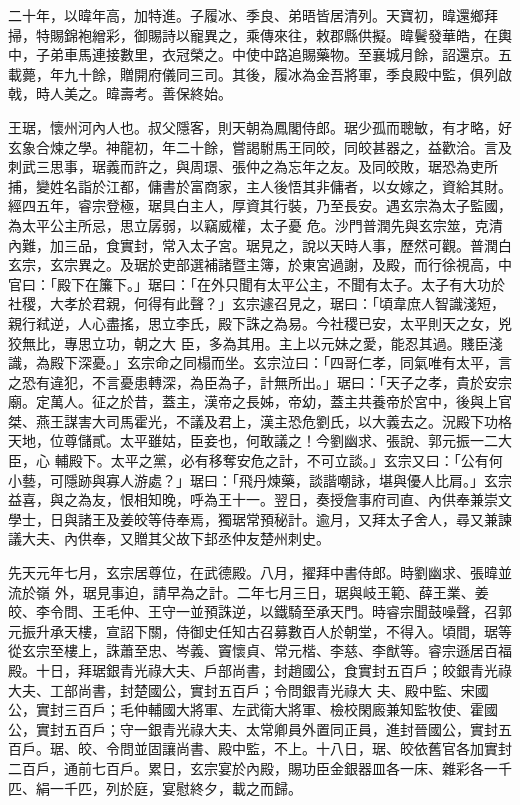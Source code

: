 \begin{pinyinscope}
 二十年，以暐年高，加特進。子履冰、季良、弟晤皆居清列。天寶初，暐還鄉拜掃，特賜錦袍繒彩，御賜詩以寵異之，乘傳來往，敕郡縣供擬。暐鬢發華皓，在輿中，子弟車馬連接數里，衣冠榮之。中使中路追賜藥物。至襄城月餘，詔還京。五載薨，年九十餘，贈開府儀同三司。其後，履冰為金吾將軍，季良殿中監，俱列啟戟，時人美之。暐壽考。善保終始。



 王琚，懷州河內人也。叔父隱客，則天朝為鳳閣侍郎。琚少孤而聰敏，有才略，好玄象合煉之學。神龍初，年二十餘，嘗謁駙馬王同皎，同皎甚器之，益歡洽。言及刺武三思事，琚義而許之，與周璟、張仲之為忘年之友。及同皎敗，琚恐為吏所捕，變姓名詣於江都，傭書於富商家，主人後悟其非傭者，以女嫁之，資給其財。經四五年，睿宗登極，琚具白主人，厚資其行裝，乃至長安。遇玄宗為太子監國，為太平公主所忌，思立孱弱，以竊威權，太子憂
 危。沙門普潤先與玄宗筮，克清內難，加三品，食實封，常入太子宮。琚見之，說以天時人事，歷然可觀。普潤白玄宗，玄宗異之。及琚於吏部選補諸暨主簿，於東宮過謝，及殿，而行徐視高，中官曰：「殿下在簾下。」琚曰：「在外只聞有太平公主，不聞有太子。太子有大功於社稷，大孝於君親，何得有此聲？」玄宗遽召見之，琚曰：「頃韋庶人智識淺短，親行弒逆，人心盡搖，思立李氏，殿下誅之為易。今社稷已安，太平則天之女，兇狡無比，專思立功，朝之大
 臣，多為其用。主上以元妹之愛，能忍其過。賤臣淺識，為殿下深憂。」玄宗命之同榻而坐。玄宗泣曰：「四哥仁孝，同氣唯有太平，言之恐有違犯，不言憂患轉深，為臣為子，計無所出。」琚曰：「天子之孝，貴於安宗廟。定萬人。征之於昔，蓋主，漢帝之長姊，帝幼，蓋主共養帝於宮中，後與上官桀、燕王謀害大司馬霍光，不議及君上，漢主恐危劉氏，以大義去之。況殿下功格天地，位尊儲貳。太平雖姑，臣妾也，何敢議之！今劉幽求、張說、郭元振一二大臣，心
 輔殿下。太平之黨，必有移奪安危之計，不可立談。」玄宗又曰：「公有何小藝，可隱跡與寡人游處？」琚曰：「飛丹煉藥，談諧嘲詠，堪與優人比肩。」玄宗益喜，與之為友，恨相知晚，呼為王十一。翌日，奏授詹事府司直、內供奉兼崇文學士，日與諸王及姜皎等侍奉焉，獨琚常預秘計。逾月，又拜太子舍人，尋又兼諫議大夫、內供奉，又贈其父故下邽丞仲友楚州刺史。



 先天元年七月，玄宗居尊位，在武德殿。八月，擢拜中書侍郎。時劉幽求、張暐並流於嶺
 外，琚見事迫，請早為之計。二年七月三日，琚與岐王範、薛王業、姜皎、李令問、王毛仲、王守一並預誅逆，以鐵騎至承天門。時睿宗聞鼓噪聲，召郭元振升承天樓，宣詔下關，侍御史任知古召募數百人於朝堂，不得入。頃間，琚等從玄宗至樓上，誅蕭至忠、岑義、竇懷貞、常元楷、李慈、李猷等。睿宗遜居百福殿。十日，拜琚銀青光祿大夫、戶部尚書，封趙國公，食實封五百戶；皎銀青光祿大夫、工部尚書，封楚國公，實封五百戶；令問銀青光祿大
 夫、殿中監、宋國公，實封三百戶；毛仲輔國大將軍、左武衛大將軍、檢校閑廄兼知監牧使、霍國公，實封五百戶；守一銀青光祿大夫、太常卿員外置同正員，進封晉國公，實封五百戶。琚、皎、令問並固讓尚書、殿中監，不上。十八日，琚、皎依舊官各加實封二百戶，通前七百戶。累日，玄宗宴於內殿，賜功臣金銀器皿各一床、雜彩各一千匹、絹一千匹，列於庭，宴慰終夕，載之而歸。




\end{pinyinscope}
